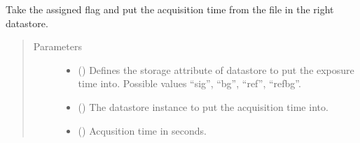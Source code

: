 \documentclass[a4paper,10pt,english]{sphinxmanual}
\begin{document}
\begin{fulllineitems}
\begin{fulllineitems}
\end{fulllineitems}


\begin{fulllineitems}
\label{\detokenize{sfgtools:sfgtools.SFGProcessTools.assign_acqtime_to_storage}}
\sphinxAtStartPar
Take the assigned flag and put the acquisition time from the file in the right datastore.
\begin{quote}\begin{description}
\item[{Parameters}] \leavevmode\begin{itemize}
\item {} 
\sphinxAtStartPar
{} () \textendash{} Defines the storage attribute of datastore to put the exposure time into. Possible values “sig”,
“bg”, “ref”, “refbg”.

\item {} 
\sphinxAtStartPar
{} () \textendash{} The datastore instance to put the acquisition time into.

\item {} 
\sphinxAtStartPar
{} () \textendash{} Acqusition time in seconds.

\end{itemize}

\end{description}\end{quote}

\end{fulllineitems}



\end{fulllineitems}
\end{document}
